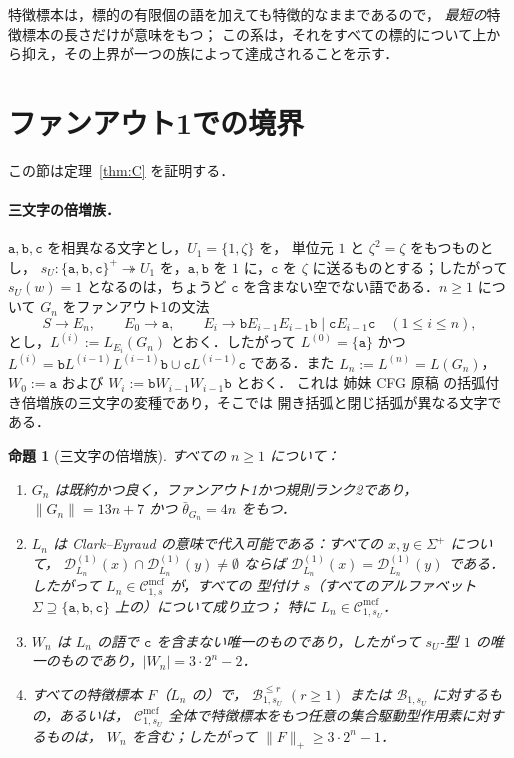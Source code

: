 \documentclass[11pt,a4paper]{ltjsarticle}
\numberwithin{equation}{section}
\theoremstyle{plain}
\newtheorem{proposition}[theorem]{命題}
\theoremstyle{definition}
\theoremstyle{remark}
\newcommand{\Cmcf}[2]{\mathcal{C}^{\mathrm{mcf}}_{#1,#2}}
\newcommand{\D}{\mathcal{D}}
\theoremstyle{plain}
\begin{document}
特徴標本は，標的の有限個の語を加えても特徴的なままであるので，
\emph{最短の}特徴標本の長さだけが意味をもつ；
この系は，それをすべての標的について上から抑え，その上界が一つの族によって達成されることを示す．

\section{ファンアウト1での境界}
\label{sec:fanout-one}

この節は定理~\ref{thm:C} を証明する．

\paragraph{三文字の倍増族．}
$\mathtt a,\mathtt b,\mathtt c$ を相異なる文字とし，$U_1=\{1,\zeta\}$ を，
単位元 $1$ と $\zeta^2=\zeta$ をもつものとし，
$s_U:\{\mathtt a,\mathtt b,\mathtt c\}^+\twoheadrightarrow U_1$ を，$\mathtt a,\mathtt b$
を $1$ に，$\mathtt c$ を $\zeta$ に送るものとする；したがって $s_U(w)=1$ となるのは，ちょうど
$\mathtt c$ を含まない空でない語である．$n\ge1$ について $G_n$ をファンアウト1の文法
\[
 S\to E_n,\qquad E_0\to\mathtt a,\qquad
 E_i\to\mathtt bE_{i-1}E_{i-1}\mathtt b\mid\mathtt cE_{i-1}\mathtt c\quad(1\le i\le n),
\]
とし，$L^{(i)}:=L_{E_i}(G_n)$ とおく．したがって $L^{(0)}=\{\mathtt a\}$ かつ
$L^{(i)}=\mathtt bL^{(i-1)}L^{(i-1)}\mathtt b\cup\mathtt cL^{(i-1)}\mathtt c$ である．また
$L_n:=L^{(n)}=L(G_n)$，$W_0:=\mathtt a$ および $W_i:=\mathtt bW_{i-1}W_{i-1}\mathtt b$ とおく．
これは
姉妹 CFG 原稿 \cite[Proposition~6.4]{kuriyamaCFG} の括弧付き倍増族の三文字の変種であり，そこでは
開き括弧と閉じ括弧が異なる文字である．

\begin{proposition}[三文字の倍増族]
\label{prop:bracketed-family}
\label{prop:three-letter-family}
すべての $n\ge1$ について：
\begin{enumerate}[label=\textup{(\roman*)},leftmargin=*]
\item $G_n$ は既約かつ良く，ファンアウト1かつ規則ランク2であり，
$\|G_n\|=13n+7$ かつ $\bar\theta_{G_n}=4n$ をもつ．
\item $L_n$ は Clark--Eyraud の意味で代入可能である：すべての $x,y\in\Sigma^+$ について，
$\D^{(1)}_{L_n}(x)\cap\D^{(1)}_{L_n}(y)\ne\emptyset$ ならば
$\D^{(1)}_{L_n}(x)=\D^{(1)}_{L_n}(y)$ である．したがって $L_n\in\Cmcf{1}{s}$ が，すべての
型付け $s$（すべてのアルファベット $\Sigma\supseteq\{\mathtt a,\mathtt b,\mathtt c\}$ 上の）について成り立つ；
特に $L_n\in\Cmcf{1}{s_U}$．
\item $W_n$ は $L_n$ の語で $\mathtt c$ を含まない唯一のものであり，したがって
$s_U$-型 $1$ の唯一のものであり，$|W_n|=3\cdot2^n-2$．
\item すべての特徴標本 $F$（$L_n$ の）で，
$\mathcal B^{\le r}_{1,s_U}$ $(r\ge1)$ または $\mathcal B_{1,s_U}$ に対するもの，あるいは，
$\Cmcf{1}{s_U}$ 全体で特徴標本をもつ任意の集合駆動型作用素に対するものは，
$W_n$ を含む；したがって $\|F\|_+\ge3\cdot2^n-1$．
\end{enumerate}
\end{proposition}
\end{document}
